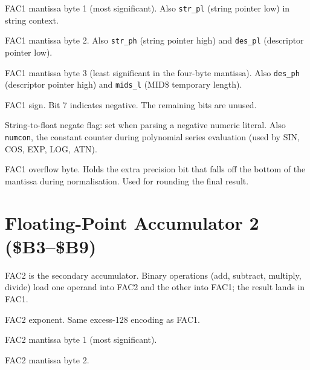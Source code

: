 
FAC1 mantissa byte 1 (most significant).  Also \texttt{str\_pl} (string
pointer low) in string context.


FAC1 mantissa byte 2.  Also \texttt{str\_ph} (string pointer high) and
\texttt{des\_pl} (descriptor pointer low).


FAC1 mantissa byte 3 (least significant in the four-byte mantissa).  Also
\texttt{des\_ph} (descriptor pointer high) and \texttt{mids\_l} (MID\$
temporary length).


FAC1 sign.  Bit 7 indicates negative.  The remaining bits are unused.


String-to-float negate flag: set when parsing a negative numeric literal.
Also \texttt{numcon}, the constant counter during polynomial series evaluation
(used by SIN, COS, EXP, LOG, ATN).


FAC1 overflow byte.  Holds the extra precision bit that falls off the bottom
of the mantissa during normalisation.  Used for rounding the final result.

\section{Floating-Point Accumulator 2 (\$B3--\$B9)}

FAC2 is the secondary accumulator.  Binary operations (add, subtract, multiply,
divide) load one operand into FAC2 and the other into FAC1; the result lands
in FAC1.


FAC2 exponent.  Same excess-128 encoding as FAC1.


FAC2 mantissa byte 1 (most significant).


FAC2 mantissa byte 2.


